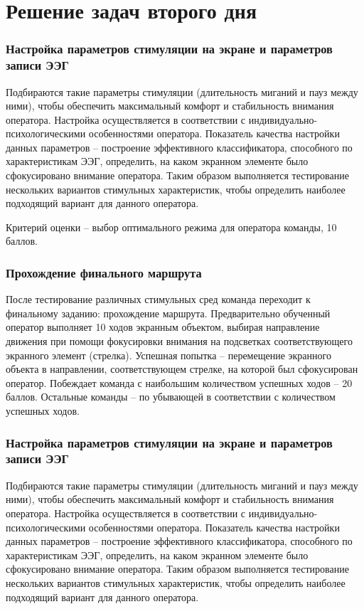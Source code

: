 \section{Решение задач второго дня}

\subsubsection*{Настройка параметров стимуляции на экране и параметров записи ЭЭГ}

Подбираются такие параметры стимуляции (длительность миганий и пауз между ними), чтобы обеспечить максимальный комфорт и стабильность внимания оператора. Настройка осуществляется в соответствии с индивидуально-психологическими особенностями оператора. Показатель качества настройки данных параметров – построение эффективного классификатора, способного по характеристикам ЭЭГ, определить, на каком экранном элементе было сфокусировано внимание оператора. Таким образом выполняется тестирование нескольких вариантов стимульных характеристик, чтобы определить наиболее подходящий вариант для данного оператора.

Критерий оценки – выбор оптимального режима для оператора команды, 10 баллов.

\subsubsection*{Прохождение финального маршрута}

После тестирование различных стимульных сред команда переходит к финальному заданию: прохождение маршрута. Предварительно обученный оператор выполняет 10 ходов экранным объектом, выбирая направление движения при помощи фокусировки внимания на подсветках соответствующего экранного элемент (стрелка). Успешная попытка – перемещение экранного объекта в направлении, соответствующем стрелке, на которой был сфокусирован оператор. Побеждает команда с наибольшим количеством успешных ходов – 20 баллов. Остальные команды – по убывающей в соответствии с количеством успешных ходов.

\solutionSection

\subsubsection*{Настройка параметров стимуляции на экране и параметров записи ЭЭГ}

Подбираются такие параметры стимуляции (длительность миганий и пауз между ними), чтобы обеспечить максимальный комфорт и стабильность внимания оператора. Настройка осуществляется в соответствии с индивидуально-психологическими особенностями оператора. Показатель качества настройки данных параметров – построение эффективного классификатора, способного по характеристикам ЭЭГ, определить, на каком экранном элементе было сфокусировано внимание оператора. Таким образом выполняется тестирование нескольких вариантов стимульных характеристик, чтобы определить наиболее подходящий вариант для данного оператора.

